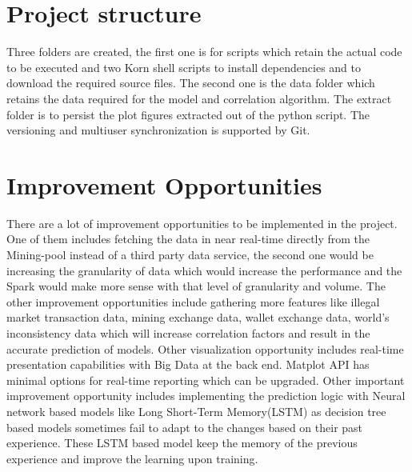 \documentclass[sigconf]{acmart}
\begin{document}
\section{Project structure}
Three folders are created, the first one is for scripts which retain the actual code to be executed and two Korn shell scripts to install dependencies and to download the required source files. The second one is the data folder which retains the data required for the model and correlation algorithm. The extract folder is to persist the plot figures extracted out of the python script. The versioning and multiuser synchronization is supported by Git. 

\section{Improvement Opportunities}
There are a lot of improvement opportunities to be implemented in the project. One of them includes fetching the data in near real-time directly from the Mining-pool instead of a third party data service, the second one would be increasing the granularity of data which would increase the performance and the Spark would make more sense with that level of granularity and volume. The other improvement opportunities include gathering more features like illegal market transaction data, mining exchange data, wallet exchange data, world's inconsistency data which will increase correlation factors and result in the accurate prediction of models. Other visualization opportunity includes real-time presentation capabilities with Big Data at the back end. Matplot API has minimal options for real-time reporting which can be upgraded.
Other important improvement opportunity includes implementing the prediction logic with Neural network based models like Long Short-Term Memory(LSTM) as decision tree based models sometimes fail to adapt to the changes based on their past experience. These LSTM based model keep the memory of the previous experience and improve the learning upon training.
\end{document}
